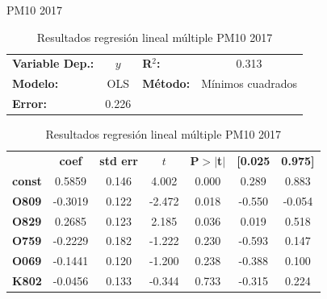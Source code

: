 \documentclass[11pt]{beamer}
\begin{document}
\begin{frame}{PM10 2017}
\begin{table}[hbt!]
\caption{Resultados regresión lineal múltiple PM10 2017}
\label{tab:RRLM PM10 2017}
\begin{center}
\begin{tabular}{lclc}
\textbf{Variable Dep.:}    &        $y$         & \textbf{  R$^2$:         } &     0.313   \\
\textbf{Modelo:}            &       OLS        & \textbf{Método:}           &  Mínimos cuadrados  \\
\textbf{Error:}            & 0.226  \\
\end{tabular}
\begin{tabular}{lcccccc}
               & \textbf{coef} & \textbf{std err} & \textbf{$t$} & \textbf{P$> |$t$|$} & \textbf{[0.025} & \textbf{0.975]}  \\
\textbf{const} &       0.5859  &        0.146     &     4.002  &         0.000        &        0.289    &        0.883     \\
\textbf{O809}  &      -0.3019  &        0.122     &    -2.472  &         0.018        &       -0.550    &       -0.054     \\
\textbf{O829}  &       0.2685  &        0.123     &     2.185  &         0.036        &        0.019    &        0.518     \\
\textbf{O759}  &      -0.2229  &        0.182     &    -1.222  &         0.230        &       -0.593    &        0.147     \\
\textbf{O069}  &      -0.1441  &        0.120     &    -1.200  &         0.238        &       -0.388    &        0.100     \\
\textbf{K802}  &      -0.0456  &        0.133     &    -0.344  &         0.733        &       -0.315    &        0.224     \\
\end{tabular}
\end{center}
\end{table}
\end{frame}
\end{document}
